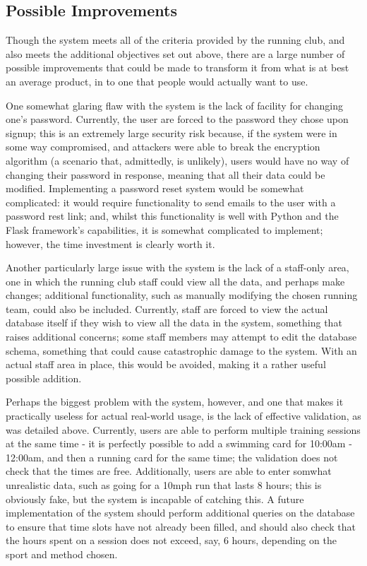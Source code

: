 \documentclass{article}[12pt,a4paper]
\begin{document}
{\subsection{Possible Improvements}
Though the system meets all of the criteria provided by the running club, and also meets the additional objectives set out above, there are a large number of possible improvements that could be made to transform it from what is at best an average product, in to one that people would actually want to use.

One somewhat glaring flaw with the system is the lack of facility for changing one's password. Currently, the user are forced to the password they chose upon signup; this is an extremely large security risk because, if the system were in some way compromised, and attackers were able to break the encryption algorithm (a scenario that, admittedly, is unlikely), users would have no way of changing their password in response, meaning that all their data could be modified. Implementing a password reset system would be somewhat complicated: it would require functionality to send emails to the user with a password rest link; and, whilst this functionality is well with Python and the Flask framework's capabilities, it is somewhat complicated to implement; however, the time investment is clearly worth it.

Another particularly large issue with the system is the lack of a staff-only area, one in which the running club staff could view all the data, and perhaps make changes; additional functionality, such as manually modifying the chosen running team, could also be included. Currently, staff are forced to view the actual database itself if they wish to view all the data in the system, something that raises additional concerns; some staff members may attempt to edit the database schema, something that could cause catastrophic damage to the system. With an actual staff area in place, this would be avoided, making it a rather useful possible addition.

Perhaps the biggest problem with the system, however, and one that makes it practically useless for actual real-world usage, is the lack of effective validation, as was detailed above. Currently, users are able to perform multiple training sessions at the same time - it is perfectly possible to add a swimming card for 10:00am - 12:00am, and then a running card for the same time; the validation does not check that the times are free. Additionally, users are able to enter somwhat unrealistic data, such as going for a 10mph run that lasts 8 hours; this is obviously fake, but the system is incapable of catching this. A future implementation of the system should perform additional queries on the database to ensure that time slots have not already been filled, and should also check that the hours spent on a session does not exceed, say, 6 hours, depending on the sport and method chosen.

}
\end{document}
